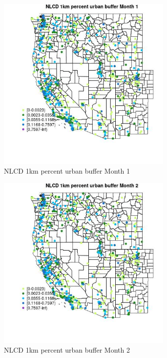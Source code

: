 \begin{figure} 
\centering  
\includegraphics[width=0.77\textwidth]{Code_Outputs/Report_ML_input_PM25_Step4_part_f_de_duplicated_aveswNAs_MapObsMo1NLCD_1km_percent_urban_buffer.jpg} 
\caption{\label{fig:Report_ML_input_PM25_Step4_part_f_de_duplicated_aveswNAsMapObsMo1NLCD_1km_percent_urban_buffer}NLCD 1km percent urban buffer Month 1} 
\end{figure} 
 

\begin{figure} 
\centering  
\includegraphics[width=0.77\textwidth]{Code_Outputs/Report_ML_input_PM25_Step4_part_f_de_duplicated_aveswNAs_MapObsMo2NLCD_1km_percent_urban_buffer.jpg} 
\caption{\label{fig:Report_ML_input_PM25_Step4_part_f_de_duplicated_aveswNAsMapObsMo2NLCD_1km_percent_urban_buffer}NLCD 1km percent urban buffer Month 2} 
\end{figure} 
 


